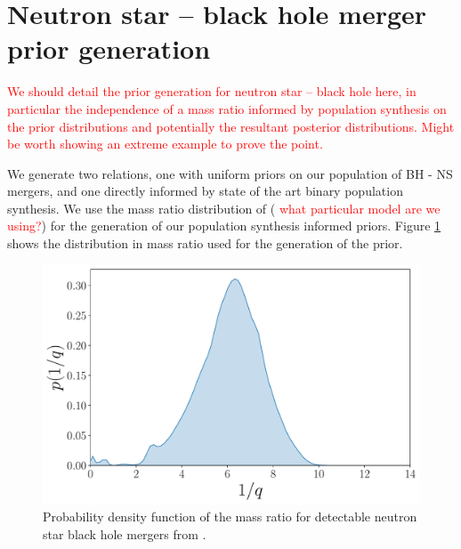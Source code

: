 \documentclass[twocolumn]{aastex631}
\newcommand{\red}[1]{\textcolor{red}{#1}}
\begin{document}
\section{Neutron star -- black hole merger prior generation}\label{sec:NSBH generation}
	
\red{We should detail the prior generation for neutron star -- black hole here, in particular the independence of a mass ratio informed by population synthesis on the prior distributions and potentially the resultant posterior distributions. Might be worth showing an extreme example to prove the point.}
	
We generate two relations, one with uniform priors on our population of BH - NS mergers, and one directly informed by state of the art binary population synthesis. We use the mass ratio distribution of \cite{2021Broekgaarden+}  (\red{ what particular model are we using?}) for the generation of our population synthesis informed priors. Figure \ref{fig:mass ratio distrbution} shows the distribution in mass ratio used for the generation of the prior. 
\begin{figure}
		\centering
		\includegraphics[width=\linewidth]{NSBH_mass_ratio_density.pdf}
		\caption{Probability density function of the mass ratio for detectable neutron star black hole mergers from \citep{2021Broekgaarden+}.}
		\label{fig:mass ratio distrbution}
\end{figure}
\end{document}
